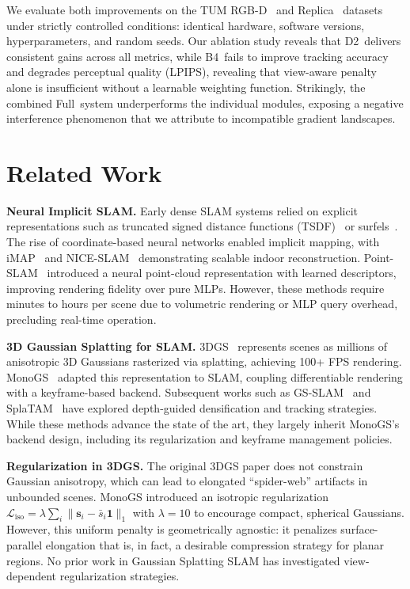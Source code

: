 \documentclass[conference]{IEEEtran}
\begin{document}
We evaluate both improvements on the TUM RGB-D~\cite{tum} and Replica~\cite{replica} datasets under strictly controlled conditions: identical hardware, software versions, hyperparameters, and random seeds.
Our ablation study reveals that {D2}~delivers consistent gains across all metrics, while {B4}~fails to improve tracking accuracy and degrades perceptual quality (LPIPS), revealing that view-aware penalty alone is insufficient without a learnable weighting function.
Strikingly, the combined Full~system underperforms the individual modules, exposing a negative interference phenomenon that we attribute to incompatible gradient landscapes.

\section{Related Work}
\label{sec:related}

\textbf{Neural Implicit SLAM.}
Early dense SLAM systems relied on explicit representations such as truncated signed distance functions (TSDF)~\cite{kinectfusion} or surfels~\cite{elasticfusion}.
The rise of coordinate-based neural networks enabled implicit mapping, with iMAP~\cite{imap} and NICE-SLAM~\cite{nice-slam} demonstrating scalable indoor reconstruction.
Point-SLAM~\cite{point-slam} introduced a neural point-cloud representation with learned descriptors, improving rendering fidelity over pure MLPs.
However, these methods require minutes to hours per scene due to volumetric rendering or MLP query overhead, precluding real-time operation.

\textbf{3D Gaussian Splatting for SLAM.}
3DGS~\cite{3dgs} represents scenes as millions of anisotropic 3D Gaussians rasterized via splatting, achieving 100+ FPS rendering.
MonoGS~\cite{monogs} adapted this representation to SLAM, coupling differentiable rendering with a keyframe-based backend.
Subsequent works such as GS-SLAM~\cite{gs-slam} and SplaTAM~\cite{splatam} have explored depth-guided densification and tracking strategies.
While these methods advance the state of the art, they largely inherit MonoGS's backend design, including its regularization and keyframe management policies.

\textbf{Regularization in 3DGS.}
The original 3DGS paper does not constrain Gaussian anisotropy, which can lead to elongated ``spider-web'' artifacts in unbounded scenes.
MonoGS introduced an isotropic regularization $\mathcal{L}_{\text{iso}} = \lambda \sum_i \|\mathbf{s}_i - \bar{s}_i \mathbf{1}\|_1$ with $\lambda=10$ to encourage compact, spherical Gaussians.
However, this uniform penalty is geometrically agnostic: it penalizes surface-parallel elongation that is, in fact, a desirable compression strategy for planar regions.
No prior work in Gaussian Splatting SLAM has investigated view-dependent regularization strategies.
\end{document}
